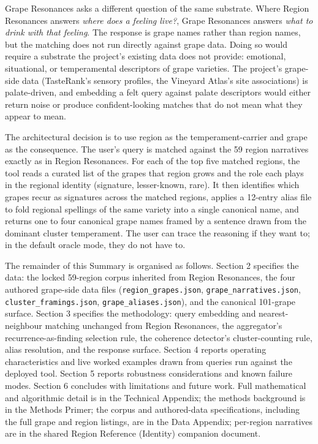 \documentclass[11pt]{article}
\begin{document}
Grape Resonances asks a different question of the same substrate. Where Region Resonances answers \emph{where does a feeling live?}, Grape Resonances answers \emph{what to drink with that feeling}. The response is grape names rather than region names, but the matching does not run directly against grape data. Doing so would require a substrate the project's existing data does not provide: emotional, situational, or temperamental descriptors of grape varieties. The project's grape-side data (TasteRank's sensory profiles, the Vineyard Atlas's site associations) is palate-driven, and embedding a felt query against palate descriptors would either return noise or produce confident-looking matches that do not mean what they appear to mean.

The architectural decision is to use region as the temperament-carrier and grape as the consequence. The user's query is matched against the 59 region narratives exactly as in Region Resonances. For each of the top five matched regions, the tool reads a curated list of the grapes that region grows and the role each plays in the regional identity (signature, lesser-known, rare). It then identifies which grapes recur as signatures across the matched regions, applies a 12-entry alias file to fold regional spellings of the same variety into a single canonical name, and returns one to four canonical grape names framed by a sentence drawn from the dominant cluster temperament. The user can trace the reasoning if they want to; in the default oracle mode, they do not have to.

The remainder of this Summary is organised as follows. Section 2 specifies the data: the locked 59-region corpus inherited from Region Resonances, the four authored grape-side data files (\texttt{region\_grapes.json}, \texttt{grape\_narratives.json}, \texttt{cluster\_framings.json}, \texttt{grape\_aliases.json}), and the canonical 101-grape surface. Section 3 specifies the methodology: query embedding and nearest-neighbour matching unchanged from Region Resonances, the aggregator's recurrence-as-finding selection rule, the coherence detector's cluster-counting rule, alias resolution, and the response surface. Section 4 reports operating characteristics and live worked examples drawn from queries run against the deployed tool. Section 5 reports robustness considerations and known failure modes. Section 6 concludes with limitations and future work. Full mathematical and algorithmic detail is in the Technical Appendix; the methods background is in the Methods Primer; the corpus and authored-data specifications, including the full grape and region listings, are in the Data Appendix; per-region narratives are in the shared Region Reference (Identity) companion document.
\end{document}
